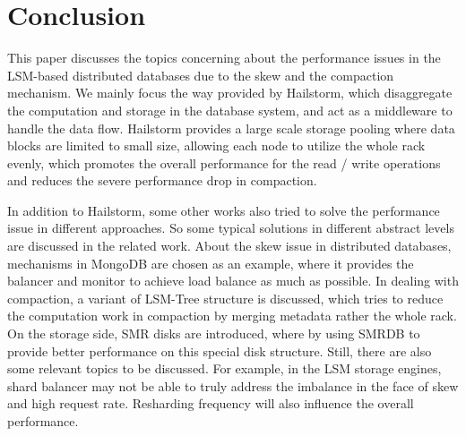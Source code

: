 \documentclass[a4paper,10pt,twoside]{article}
\begin{document}
\section{Conclusion}
This paper discusses the topics concerning about the performance issues in the LSM-based distributed databases due to the skew and the compaction mechanism.
We mainly focus the way provided by Hailstorm, which disaggregate the computation and storage in the database system, and act as a middleware to handle the data flow.
Hailstorm provides a large scale storage pooling where data blocks are limited to small size, allowing each node to utilize the whole rack evenly, 
which promotes the overall performance for the read / write operations and reduces the severe performance drop in compaction.
\par
In addition to Hailstorm, some other works also tried to solve the performance issue in different approaches.
So some typical solutions in different abstract levels are discussed in the related work.
About the skew issue in distributed databases, mechanisms in MongoDB are chosen as an example, where it provides the balancer and monitor to achieve load balance as much as possible.
In dealing with compaction, a variant of LSM-Tree structure is discussed, which tries to reduce the computation work in compaction by merging metadata rather the whole rack.
On the storage side, SMR disks are introduced, where by using SMRDB to provide better performance on this special disk structure.
Still, there are also some relevant topics to be discussed. 
For example, in the LSM storage engines, shard balancer may not be able to truly address the imbalance in the face of skew and high request rate.
Resharding frequency will also influence the overall performance.

\newpage

 
\end{document}
